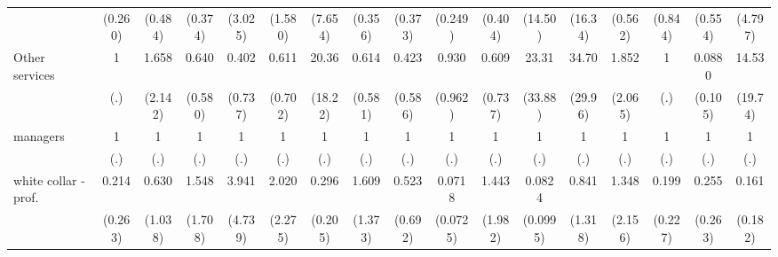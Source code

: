 {\begin{tabular}{l*{16}{c}}
                    &     (0.260)         &     (0.484)         &     (0.374)         &     (3.025)         &     (1.580)         &     (7.654)         &     (0.356)         &     (0.373)         &     (0.249)         &     (0.404)         &     (14.50)         &     (16.34)         &     (0.562)         &     (0.844)         &     (0.554)         &     (4.797)         \\
[1em]
Other services      &           1         &       1.658         &       0.640         &       0.402         &       0.611         &       20.36\sym{***}&       0.614         &       0.423         &       0.930         &       0.609         &       23.31\sym{*}  &       34.70\sym{***}&       1.852         &           1         &      0.0880\sym{*}  &       14.53\sym{*}  \\
                    &         (.)         &     (2.142)         &     (0.580)         &     (0.737)         &     (0.702)         &     (18.22)         &     (0.581)         &     (0.586)         &     (0.962)         &     (0.737)         &     (33.88)         &     (29.96)         &     (2.065)         &         (.)         &     (0.105)         &     (19.74)         \\
[1em]
managers            &           1         &           1         &           1         &           1         &           1         &           1         &           1         &           1         &           1         &           1         &           1         &           1         &           1         &           1         &           1         &           1         \\
                    &         (.)         &         (.)         &         (.)         &         (.)         &         (.)         &         (.)         &         (.)         &         (.)         &         (.)         &         (.)         &         (.)         &         (.)         &         (.)         &         (.)         &         (.)         &         (.)         \\
[1em]
white collar - prof.&       0.214         &       0.630         &       1.548         &       3.941         &       2.020         &       0.296         &       1.609         &       0.523         &      0.0718\sym{**} &       1.443         &      0.0824\sym{*}  &       0.841         &       1.348         &       0.199         &       0.255         &       0.161         \\
                    &     (0.263)         &     (1.038)         &     (1.708)         &     (4.739)         &     (2.275)         &     (0.205)         &     (1.373)         &     (0.692)         &    (0.0725)         &     (1.982)         &    (0.0995)         &     (1.318)         &     (2.156)         &     (0.227)         &     (0.263)         &     (0.182)         \\

\end{tabular}}
